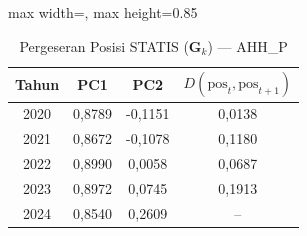 \begin{table}[H]
\centering
\caption{Pergeseran Posisi STATIS ($\mathbf{G}_k$) --- AHH_P} \label{tab:app2jarak_statis_loading_ahh_p}
\begin{adjustbox}{max width=\textwidth, max height=0.85\textheight}
\begin{tabular}{|c|c|c|c|}
\hline
\textbf{Tahun} & \textbf{PC1} & \textbf{PC2} & \textbf{$D(\text{pos}_t, \text{pos}_{t+1})$} \\
\hline
2020 & 0,8789 & -0,1151 & 0,0138 \\
2021 & 0,8672 & -0,1078 & 0,1180 \\
2022 & 0,8990 & 0,0058 & 0,0687 \\
2023 & 0,8972 & 0,0745 & 0,1913 \\
2024 & 0,8540 & 0,2609 & -- \\
\hline
\end{tabular}
\end{adjustbox}
\end{table}